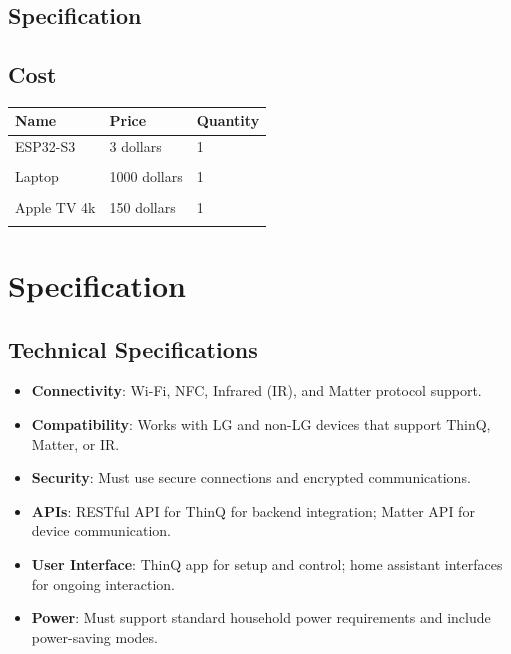 \documentclass[conference]{IEEEtran}
\begin{document}
\begin{enumerate}[label=\arabic*.]
\end{enumerate}

\subsection{\large{Specification}}

\subsection{\large{Cost}}
\begin{table}[H]
\center
\begin{tabular}{m{1.7cm} m{1.4cm} m{1.4cm}}
\toprule
Name & Price & Quantity\\
\midrule
ESP32-S3 & 3 dollars &1\\\\
Laptop & 1000 dollars & 1\\\\
Apple TV 4k & 150 dollars & 1\\\\
\bottomrule
\end{tabular}
\end{table}


\section{\large{Specification}}

\subsection{\large{Technical Specifications}}
\begin{itemize}
\item \textbf{Connectivity}: Wi-Fi, NFC, Infrared (IR), and Matter protocol support.\\
\item \textbf{Compatibility}: Works with LG and non-LG devices that support ThinQ, Matter, or IR.\\
\item \textbf{Security}: Must use secure connections and encrypted communications.\\
\item \textbf{APIs}: RESTful API for ThinQ for backend integration; Matter API for device communication.\\
\item \textbf{User Interface}: ThinQ app for setup and control; home assistant interfaces for ongoing interaction.\\
\item \textbf{Power}: Must support standard household power requirements and include power-saving modes.\\
\end{itemize}
\end{document}
